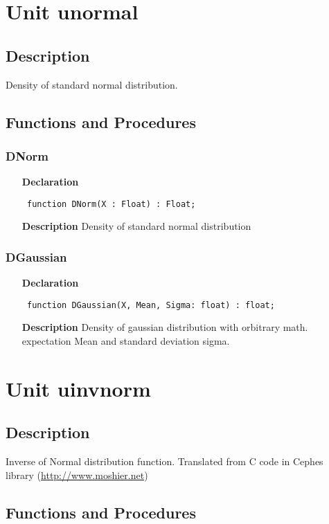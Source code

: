 \documentclass[12pt,a4paper,oneside]{report}
\newcommand{\lmath}[1]{   %
	\marginpar{\vspace{#1} 
		\begin{flushright}
			LMath
	\end{flushright} }
}
\newcommand{\declarationitem}[1]{\textbf{#1}}
\newcommand{\descriptiontitle}[1]{\textbf{#1}}
\newcommand{\code}[1]{\texttt{#1}}
\begin{document}
\section{Unit unormal}
\label{unormal}
\subsection{Description}
Density of standard normal distribution. 
\subsection{Functions and Procedures}
\subsubsection{DNorm}
\label{unormal-DNorm}
\begin{itemize}\item[\declarationitem{Declaration}\hfill]
	\begin{flushleft}
		\code{
			function DNorm(X : Float) : Float;}
	\end{flushleft}
	\item[\descriptiontitle{Description}]
	Density of standard normal distribution
\end{itemize}
\subsubsection{DGaussian}\lmath{-24pt}
\label{unormal-DGaussian}
\begin{itemize}\item[\declarationitem{Declaration}\hfill]
	\begin{flushleft}
		\code{
			function DGaussian(X, Mean, Sigma: float) : float;}
	\end{flushleft}
	\item[\descriptiontitle{Description}]
	Density of gaussian distribution with orbitrary math. expectation Mean and standard deviation sigma.
\end{itemize}
\section{Unit uinvnorm}
\label{uinvnorm}
\subsection{Description}
Inverse of Normal distribution function. 
Translated from C code in Cephes library (\href{http://www.moshier.net}{http://www.moshier.net}) \subsection{Functions and Procedures}
\end{document}
